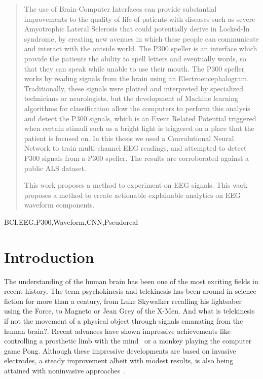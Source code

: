 \documentclass[conference]{IEEEtran}
\begin{document}
\begin{abstract}
The use of Brain-Computer Interfaces can provide substantial improvements to the quality of life of patients with diseases such as severe Amyotrophic Lateral Sclerosis that could potentially derive in Locked-In syndrome, by creating new avenues in which these people can communicate and interact with the outside world. The P300 speller is an interface which provide the patients the ability to spell letters and eventually words, so that they can speak while unable to use their mouth. The P300 speller works by reading signals from the brain using an Electroencephalogram. Traditionally, these signals were plotted and interpreted by specialized technicians or neurologists, but the development of Machine learning algorithms for classification allow the computers to perform this analysis and detect the P300 signals, which is an Event Related Potential triggered when certain stimuli such as a bright light is triggered on a place that the patient is focused on. In this thesis we used a Convolutional Neural Network to train multi-channel EEG readings, and attempted to detect P300 signals from a P300 speller. The results are corroborated against a public ALS dataset.


This work proposes a method to experiment on EEG signals.
This work proposes a method to create actionable explainable analytics on EEG waveform components.



\end{abstract}

\begin{IEEEkeywords}
BCI,EEG,P300,Waveform,CNN,Pseudoreal
\end{IEEEkeywords}

\section{Introduction}
\label{intro}

The understanding of the human brain has been one of the most exciting fields in recent history. The term psychokinesis and telekinesis has been around in science fiction for more than a century, from Luke Skywalker recalling his lightsaber using the Force, to Magneto  or Jean Grey of the X-Men. And what is telekinesis if not the movement of a physical object through signals emanating from the human brain?\cite{bcianiversary:10.1080/00051144.2019.1570644}. Recent advances have shown impressive achievements like controlling a prosthetic limb with the mind~\cite{Ajiboye.2017} or a monkey playing the computer game Pong\cite{neuralinkpong,info:neuralink/10.2196/16194}.  Although these  impressive developments are based on invasive electrodes, a steady improvement albeit with modest results, is also being attained with noninvasive approaches~\cite{Huggins.etal2022}.
\end{document}
